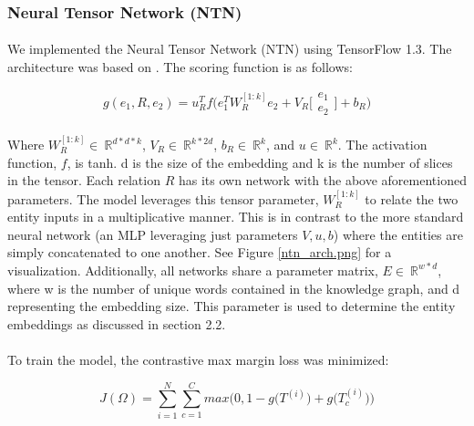 \documentclass[11.5pt]{article}
\newcounter{Figure}
\newcommand{\R}{\ \mathbb{R}}
\begin{document}
\subsubsection{Neural Tensor Network (NTN)}
\paragraph{}  We implemented the Neural Tensor Network (NTN) using TensorFlow 1.3. The architecture was based on \cite{socher2013reasoning}. The scoring function is as follows:

\begin{equation}
g(e_1,R,e_2)  = u_R^Tf \bigg( e_1^TW_R^{[1:k]}e_2 + V_R 
\bigg[ \begin{matrix}  e_1 \\ e_2  \end{matrix} \bigg] + b_R \bigg)
\end{equation}

\paragraph{}  Where  $ W_R^{[1:k]} \in \R^ {d * d * k} $, $ V_R \in \R^ {k * 2d} $, $ b_R \in \R^ {k } $, and  $ u \in \R^ {k } $. The activation function, $f$, is tanh. d is the size of the embedding and k is the number of slices in the tensor. Each relation $R$ has its own network with the above aforementioned parameters. The model leverages this tensor parameter, $ W_R^{[1:k]} $ to relate the two entity inputs in a multiplicative manner. This is in contrast to the more standard neural network (an MLP leveraging just parameters $ V,u,b $) where the entities are simply concatenated to one another. See Figure \ref{ntn_arch.png} for a visualization. Additionally, all networks share a parameter matrix, $E \in \R^{w*d} $, where w is the number of unique words contained in the knowledge graph, and d representing the embedding size. This parameter is used to determine the entity embeddings as discussed in section 2.2.

\paragraph{}  To train the model, the contrastive max margin loss was minimized:


\begin{equation}
J(\Omega)  = \sum_{i=1}^{N} \sum_{c=1}^{C} max \bigg(0,1 - g\bigg( T^(i) \bigg) +  g\bigg( T_c^(i) \bigg)   \bigg)
\end{equation}
\end{document}
